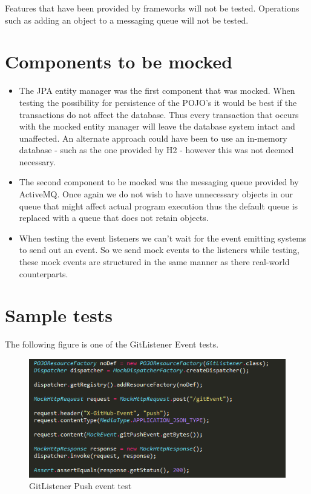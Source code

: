 \documentclass[11pt,a4paper]{article}
\begin{document}
Features that have been provided by frameworks will not be tested. Operations such as adding an object to a messaging queue will not be tested.

\section{Components to be mocked}
\begin{itemize}
	\item The JPA entity manager was the first component that was mocked. When testing the possibility for persistence of the POJO's it would be best if the transactions do not affect the database. Thus every transaction that occurs with the mocked entity manager will leave the database system intact and unaffected. An alternate approach could have been to use an in-memory database - such as the one provided by H2 - however this was not deemed necessary. \\
	
	\item The second component to be mocked was the messaging queue provided by ActiveMQ. Once again we do not wish to have unnecessary objects in our queue that might affect actual program execution thus the default queue is replaced with a queue that does not retain objects. \\
	
	\item When testing the event listeners we can't wait for the event emitting systems to send out an event. So we send mock events to the listeners while testing, these mock events are structured in the same manner as there real-world counterparts.
\end{itemize}

\section{Sample tests}
The following figure is one of the GitListener Event tests.

\begin{figure}[H]
	\begin{center}
		\includegraphics[scale=1.0]{../Images/sample1.png}
		\caption{GitListener Push event test}
	\end{center}
\end{figure}
\end{document}
